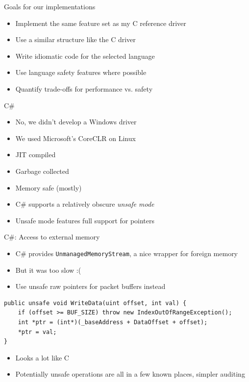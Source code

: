 \documentclass[NET,english,aspectratio=169,notitleframe,draft]{tumbeamer}
\begin{document}
\begin{frame}{Goals for our implementations}
\begin{itemize}
\item Implement the same feature set as my C reference driver
\item Use a similar structure like the C driver
\item Write idiomatic code for the selected language
\item Use language safety features where possible
\item Quantify trade-offs for performance vs. safety
\end{itemize}
\end{frame}


\begin{frame}{}
\centering {}
\end{frame}


\begin{frame}{C\#}
\begin{itemize}
\item No, we didn't develop a Windows driver
\item We used Microsoft's CoreCLR on Linux
\pause
\vspace{1em}
\item JIT compiled
\item Garbage collected
\item Memory safe (mostly)
\pause
\vspace{1em}
\item C\# supports a relatively obscure \emph{unsafe mode}
\item Unsafe mode features full support for pointers
\end{itemize}
\end{frame}

\begin{frame}[fragile]{C\#: Access to external memory}
\begin{itemize}
\item C\# provides \texttt{UnmanagedMemoryStream}, a nice wrapper for foreign memory
\item But it was too slow :(
\pause
\item Use unsafe raw pointers for packet buffers instead
\end{itemize}
\begin{verbatim}
public unsafe void WriteData(uint offset, int val) {
    if (offset >= BUF_SIZE) throw new IndexOutOfRangeException();
    int *ptr = (int*)(_baseAddress + DataOffset + offset);
    *ptr = val;
}
\end{verbatim}
\begin{itemize}
\pause
\item Looks a lot like C
\item Potentially unsafe operations are all in a few known places, simpler auditing
\end{itemize}
\end{frame}
\end{document}
